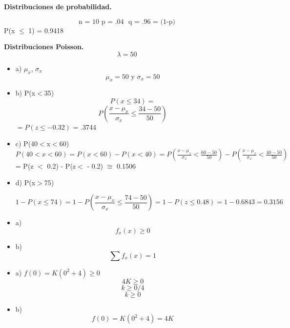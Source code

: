 \documentclass{../oxmathproblems}
\begin{document}
\begin{questions}

\miquestion\textbf {Distribuciones de probabilidad.}

$$ \text {n = 10 } 
\text {p = .04 }
\text { q = .96 = (1-p)} 
$$
P(x $\leq$ 1) = 0.9418



\miquestion\textbf{Distribuciones Poisson. }
$$ \lambda = 50 $$  
\begin{itemize}
\item a) $\mu_x$, $\sigma_x$
$$ \mu_x = 50 \text{ y } \sigma_x = 50 $$

\item  b) P(x$<$35)
$$ 
P(x \leq 34)  = $$  
$$ P( \frac{x - \mu_x}{\sigma_x}  \leq \frac{34-50}{50})  
$$ 
 $ = P(z \leq -0.32) $  = .3744  %
 
 
 
\item  c) P(40$<$x$<$60) 
$  P (40 < x < 60) = P(x < 60) - P(x < 40) =  P(\frac{x - \mu_x}{\sigma_x} < \frac{60-50}{50}) - P(\frac{x - \mu_x}{\sigma_x} < \frac{40-50}{50}) 
$
= P(z $<$ 0.2) - P(z$<$ - 0.2) $\cong$ 0.1506 %


\item  d) P(x$>$75)

$$ 1- P( x \leq 74) = 1- P(\frac{x - \mu_x}{\sigma_x} \leq \frac{74-50}{50}) 
= 1- P(z \leq 0.48) 
= 1 - 0.6843  = 0.3156  $$  %
\end{itemize}

\miquestion 

\begin{itemize}
\item a) $$ f_x (x) \geq 0 $$ 
\item  b) $$ \sum f_x (x) = 1 $$
\end{itemize}


\begin{itemize}
\item a) $f(0) = K(0^2 + 4) \geq 0 $
$$ 4K \geq 0 $$
 $$ k \geq 0/ 4$$
$$ k \geq 0 $$

\item  b) 
$$f(0) = K(0^2 + 4) =  4K $$


\end{itemize}
\end{questions}
\end{document}
